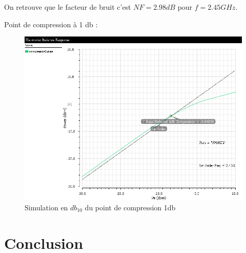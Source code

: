 \documentclass[a4paper]{article}
\begin{document}
On retrouve que le facteur de bruit c'est $NF= 2.98 dB$ pour $f=2.45GHz$.



Point de compression \`a 1 db :

\begin{figure}[!htb]
\begin{center}
  \includegraphics[scale=0.45]{Q6-1dB_Compression.png}
  \caption{Simulation en $db_{10}$ du point de compression 1db}
  \label{facteur-bruit}
\end{center}
\end{figure}





\clearpage
\section*{Conclusion}
\end{document}
